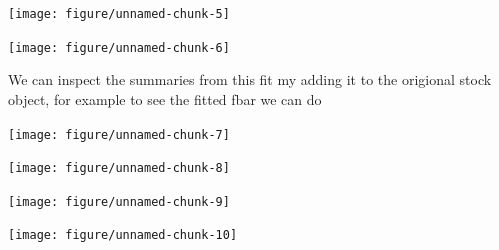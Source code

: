 \documentclass[a4paper,english,10pt]{article}\usepackage[]{graphicx}\usepackage[]{color}
\newenvironment{knitrout}{}{} %
\begin{document}
\begin{knitrout}
\color{fgcolor}

{\centering \texttt{[image: figure/unnamed-chunk-5]} 

}



\end{knitrout}


\begin{knitrout}
\color{fgcolor}

{\centering \texttt{[image: figure/unnamed-chunk-6]} 

}



\end{knitrout}


We can inspect the summaries from this fit my adding it to the origional stock object, for example to see the fitted fbar we can do

\begin{knitrout}
\color{fgcolor}

{\centering \texttt{[image: figure/unnamed-chunk-7]} 

}



\end{knitrout}


\begin{knitrout}
\color{fgcolor}

{\centering \texttt{[image: figure/unnamed-chunk-8]} 

}



\end{knitrout}


\begin{knitrout}
\color{fgcolor}

{\centering \texttt{[image: figure/unnamed-chunk-9]} 

}



\end{knitrout}


\begin{knitrout}
\color{fgcolor}

{\centering \texttt{[image: figure/unnamed-chunk-10]} 

}



\end{knitrout}
\end{document}
